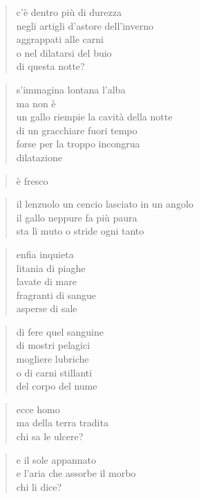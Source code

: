\clearpage


\begin{verse}
    c’è dentro più di durezza\\
    negli artigli d'astore dell'inverno\\
    aggrappati alle carni\\
    o nel dilatarsi del buio\\
    di questa notte?
\end{verse}

\begin{verse}
    s'immagina lontana l'alba\\
    ma non è\\
    un gallo riempie la cavità della notte\\
    di un gracchiare fuori tempo\\
    forse per la troppo incongrua\\
    dilatazione
\end{verse}

\begin{verse}
    è fresco
\end{verse}

\begin{verse}
    il lenzuolo un cencio lasciato in un angolo\\
    il gallo neppure fa più paura\\
    sta lì muto o stride ogni tanto
\end{verse}

\clearpage


\begin{verse}
    enfia inquieta\\
    litania di piaghe\\
    lavate di mare\\
    fragranti di sangue\\
    asperse di sale
\end{verse}

\begin{verse}
    di fere quel sanguine\\
    di mostri pelagici\\
    mogliere lubriche\\
    o di carni stillanti\\
    del corpo del nume
\end{verse}

\begin{verse}
    ecce homo\\
    ma della terra tradita\\
    chi sa le ulcere?
\end{verse}

\begin{verse}
    e il sole appannato\\
    e l’aria che assorbe il morbo\\
    chi li dice?
\end{verse}
